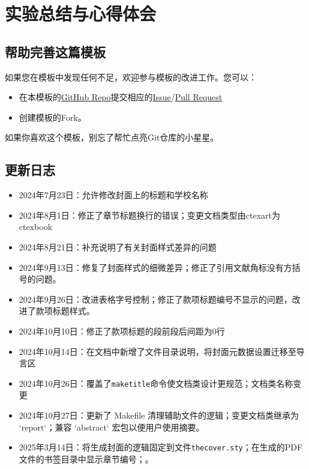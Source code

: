 \chapter{实验总结与心得体会}

\section{帮助完善这篇模板}\label{sec:joinus}

如果您在模板中发现任何不足，欢迎参与模板的改进工作。您可以：

\begin{itemize}
    \item 在本模板的\href{https://github.com/GitHubonline1396529/dlmuucexpreport}{GitHub Repo}提交相应的\href{https://github.com/GitHubonline1396529/dlmuucexpreport/issues}{Issue}/\href{https://github.com/GitHubonline1396529/dlmuucexpreport/pulls}{Pull Request}
    \item 创建模板的Fork。
\end{itemize}

如果你喜欢这个模板，别忘了帮忙点亮Git仓库的小星星。

\section{更新日志}

\begin{itemize}
    \item 2024年7月23日：允许修改封面上的标题和学校名称
    \item 2024年8月1日：修正了章节标题换行的错误；变更文档类型由ctexart为ctexbook
    \item 2024年8月21日：补充说明了有关封面样式差异的问题
    \item 2024年9月13日：修复了封面样式的细微差异；修正了引用文献角标没有方括号的问题。
    \item 2024年9月26日：改进表格字号控制；修正了款项标题编号不显示的问题，改进了款项标题样式。
    \item 2024年10月10日：修正了款项标题的段前段后间距为0行
    \item 2024年10月14日：在文档中新增了文件目录说明，将封面元数据设置迁移至导言区
    \item 2024年10月26日：覆盖了\texttt{maketitle}命令使文档类设计更规范；文档类名称变更
    \item 2024年10月27日：更新了 Makefile 清理辅助文件的逻辑；变更文档类继承为 `report`；兼容 `abstract` 宏包以便用户使用摘要。
    \item 2025年3月14日：将生成封面的逻辑固定到文件\texttt{thecover.sty}；在生成的PDF文件的书签目录中显示章节编号；。
\end{itemize}
